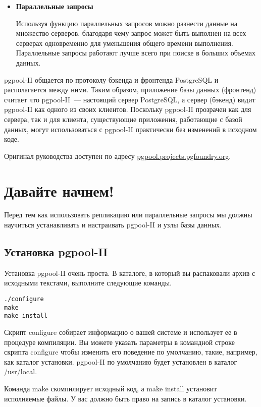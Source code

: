 \begin{itemize}
\item \textbf{Параллельные запросы}

Используя функцию параллельных запросов можно разнести данные на множество серверов, благодаря чему запрос может 
быть выполнен на всех серверах одновременно для уменьшения общего времени выполнения. Параллельные запросы работают 
лучше всего при поиске в больших объемах данных.
\end{itemize}

pgpool-II общается по протоколу бэкенда и фронтенда PostgreSQL и располагается между ними. 
Таким образом, приложение базы данных (фронтенд) считает что pgpool-II~--- настоящий сервер PostgreSQL, а сервер (бэкенд) 
видит pgpool-II как одного из своих клиентов. Поскольку pgpool-II прозрачен как для сервера, так и для клиента, 
существующие приложения, работающие с базой данных, могут использоваться с pgpool-II практически без изменений в исходном коде.

Оригинал руководства доступен по адресу \href{http://pgpool.projects.pgfoundry.org/pgpool-II/doc/tutorial-en.html}{pgpool.projects.pgfoundry.org}.

\section{Давайте начнем!}
\label{sec:pgpool-II-begin}
Перед тем как использовать репликацию или параллельные запросы мы должны научиться устанавливать и настраивать pgpool-II 
и узлы базы данных.

\subsection{Установка pgpool-II}
Установка pgpool-II очень проста. В каталоге, в который вы распаковали архив 
с исходными текстами, выполните следующие команды.
\begin{lstlisting}[label=lst:pgpool1,caption=Установка pgpool-II]
./configure
make
make install
\end{lstlisting}

Скрипт configure собирает информацию о вашей системе и использует ее в процедуре компиляции. Вы можете 
указать параметры в командной строке скрипта configure чтобы изменить его поведение по умолчанию, такие, например, 
как каталог установки. pgpool-II по умолчанию будет установлен в каталог /usr/local.

Команда make скомпилирует исходный код, а make install установит исполняемые файлы. У вас должно быть право на 
запись в каталог установки.

